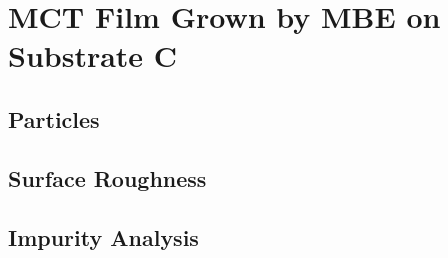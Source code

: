 \clearpage
\section{MCT Film Grown by MBE on  Substrate C}\label{sec:subCc}

\subsection{Particles}

\subsection{Surface Roughness}

\subsection{Impurity Analysis}

